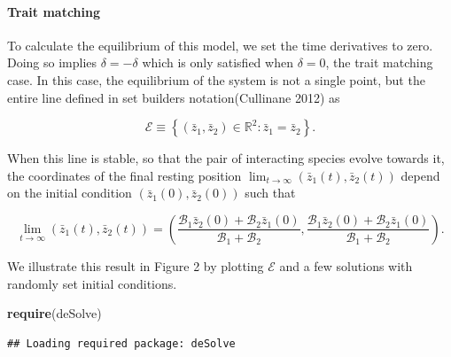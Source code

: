\documentclass[]{article}
\newenvironment{Shaded}{\begin{snugshade}}{\end{snugshade}}
\newcommand{\KeywordTok}[1]{\textcolor[rgb]{0.13,0.29,0.53}{\textbf{#1}}}
\newcommand{\NormalTok}[1]{#1}
\let\oldparagraph\paragraph
\renewcommand{\paragraph}[1]{\oldparagraph{#1}\mbox{}}
\begin{document}
\hypertarget{trait-matching}{%
\paragraph{Trait matching}\label{trait-matching}}

To calculate the equilibrium of this model, we set the time derivatives
to zero. Doing so implies \(\delta=-\delta\) which is only satisfied
when \(\delta=0\), the trait matching case. In this case, the
equilibrium of the system is not a single point, but the entire line
defined in set builders notation(Cullinane 2012) as

\begin{equation}
\mathscr{E}\equiv\left\{(\bar z_1,\bar z_2)\in\mathbb{R}^2:\bar z_1=\bar z_2\right\}.
\end{equation}

When this line is stable, so that the pair of interacting species evolve
towards it, the coordinates of the final resting position
\(\lim_{t\rightarrow\infty}(\bar z_1(t),\bar z_2(t))\) depend on the
initial condition \((\bar z_1(0),\bar z_2(0))\) such that

\begin{equation}
\lim_{t\rightarrow\infty}(\bar z_1(t),\bar z_2(t))=\left(
\frac{\mathscr{B}_1\bar z_2(0)+\mathscr{B}_2\bar z_1(0)}{\mathscr{B}_1+\mathscr{B}_2},
\frac{\mathscr{B}_1\bar z_2(0)+\mathscr{B}_2\bar z_1(0)}{\mathscr{B}_1+\mathscr{B}_2}\right).
\end{equation}

We illustrate this result in Figure 2 by plotting \(\mathscr{E}\) and a
few solutions with randomly set initial conditions.

\begin{Shaded}
\begin{Highlighting}[]
\KeywordTok{require}\NormalTok{(deSolve)}
\end{Highlighting}
\end{Shaded}

\begin{verbatim}
## Loading required package: deSolve
\end{verbatim}
\end{document}
